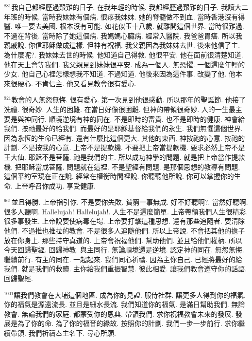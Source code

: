 \documentclass{book}
\begin{document}
$^{881}$我自己都經歷過艱難的日子.
在我年輕的時候.
我都經歷過艱難的日子.
我讀大二年班的時候.
當時我妹妹有個病.
很疼我妹妹.
她的脊髓做不到血.
當時香港沒有得醫.
唯一要去美國.
根本沒有可能.
如花似玉十八歲.
就離開這個世界.
當時很難過.
不過在背後.
當時除了她這個病.
我媽媽心臟病.
經常入醫院.
我爸爸胃癌.
所以我親戚說.
你信耶穌做成這樣.
但神有祝福.
我父親因為我妹妹去世.
後來他信了主.
為什麼呢?.
我妹妹去世的時候.
他知道自己得救.
他很平安.
他在面前很清楚知道.
他在天上會等我們.
我父親見到妹妹很平安.
成為一個人.
無恐懼.
一個這麼年輕的少女.
他自己心裡怎樣想我不知道.
不過知道.
他後來因為這件事.
改變了他.
他本來很硬心.
不肯信主.
他又看見教會很有愛心.

$^{921}$教會的人無怨無悔.
很有愛心.
第一次見到他很感動.
所以那年的聖誕節.
他接了洗禮.
很奇妙.
人生的困難.
在當日好像很困難.
但神的帶領很奇妙.
人的一生最主要是與神同行.
順境逆境有神的同在.
不是即時的富貴.
也不是即時的健康.
神會給我們.
按祂最好的給我們.
而最好的是耶穌基督給我們的永生.
我們無懼這個世界.
因為永恆的生命已經有.
還有什麼比這個更大.
其他的東西.
神按祂的心意.
按祂的計劃.
不是按我的心意.
上帝不是提款機.
不要把上帝當提款機.
要求必然上帝不是王大仙.
耶穌不是菩薩.
祂是我們的主.
所以成功神學的問題.
就是把上帝當作提款機.
把耶穌當成菩薩.
問題就在這裡.
不是聖經有問題.
是那個思想的教導有問題.
這個平約室現在正在說.
經常在權衡時間裡說.
你聽聽他所說.
你可以掌握你的生命.
上帝呼召你成功.
享受健康.

$^{961}$並且得勝.
上帝指引你.
不是要你失敗.
貧窮一事無成.
好不好聽啊?.
當然好聽啊.
很多人聽啊.
Hallelujah! Hallelujah!.
人生不是這麼簡單.
上帝帶領我們人生很精彩.
很多事發生.
上帝說要使病毒在場.
上帝要打擊這種思想.
還有那些追隨者.
要清除他們.
不過推也推拉的教會.
不是很多人追隨他們.
所以上帝說.
不會把其他的擔子放在你身上.
那些持守真道的.
上帝會祝福他們.
幫助他們.
並且給他們權柄.
所以今天回歸聖經.
回歸神教.
與主同行.
無論順境還是逆境.
認定神的同在.
無怨無悔.
繼續前行.
有主的同在.
一起起來.
我們同心祈禱.
因為主你自己.
已經將最好的給我們.
就是我們的救贖.
主你給我們重振智慧.
彼此相愛.
讓我們教會遵守你的話語.
回歸聖經.

$^{1001}$讓我們教會在大埔這個地區.
成為你的見證.
服侍社群.
讓更多人得到你的福氣.
你的福氣是源遠流長.
並且是細水長流.
我們知道你的福氣.
是滿日幫助我們.
無論教會.
無論我們的家庭.
都蒙受你的恩典.
帶領我們.
求你祝福教會未來的發展.
發展是為了你的命.
為了你的福音的緣故.
按照你的計劃.
我們一步一步前行.
求你繼續帶領.
我們祈禱奉主名下.
尋心所願.
\newpage
\end{document}
